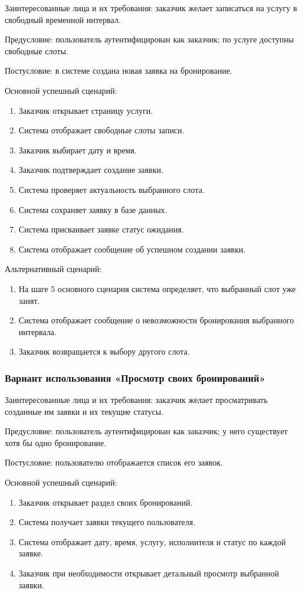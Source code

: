 Заинтересованные лица и их требования: заказчик желает записаться на услугу в свободный временной интервал.

Предусловие: пользователь аутентифицирован как заказчик; по услуге доступны свободные слоты.

Постусловие: в системе создана новая заявка на бронирование.

Основной успешный сценарий:
\begin{enumerate}
	\item Заказчик открывает страницу услуги.
	\item Система отображает свободные слоты записи.
	\item Заказчик выбирает дату и время.
	\item Заказчик подтверждает создание заявки.
	\item Система проверяет актуальность выбранного слота.
	\item Система сохраняет заявку в базе данных.
	\item Система присваивает заявке статус ожидания.
	\item Система отображает сообщение об успешном создании заявки.
\end{enumerate}

Альтернативный сценарий:
\begin{enumerate}
	\item На шаге 5 основного сценария система определяет, что выбранный слот уже занят.
	\item Система отображает сообщение о невозможности бронирования выбранного интервала.
	\item Заказчик возвращается к выбору другого слота.
\end{enumerate}

\subsubsection{Вариант использования «Просмотр своих бронирований»}

Заинтересованные лица и их требования: заказчик желает просматривать созданные им заявки и их текущие статусы.

Предусловие: пользователь аутентифицирован как заказчик; у него существует хотя бы одно бронирование.

Постусловие: пользователю отображается список его заявок.

Основной успешный сценарий:
\begin{enumerate}
	\item Заказчик открывает раздел своих бронирований.
	\item Система получает заявки текущего пользователя.
	\item Система отображает дату, время, услугу, исполнителя и статус по каждой заявке.
	\item Заказчик при необходимости открывает детальный просмотр выбранной заявки.
\end{enumerate}

